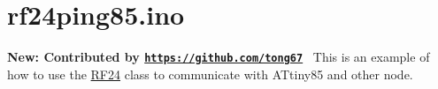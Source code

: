 \hypertarget{rf24ping85_8ino-example}{\section{rf24ping85.\+ino}
}
{\bfseries New\+: Contributed by \href{https://github.com/tong67}{\tt https\+://github.\+com/tong67}}~\newline
 This is an example of how to use the \hyperlink{class_r_f24}{R\+F24} class to communicate with A\+Ttiny85 and other node. ~\newline



\begin{DoxyCodeInclude}
\end{DoxyCodeInclude}
 